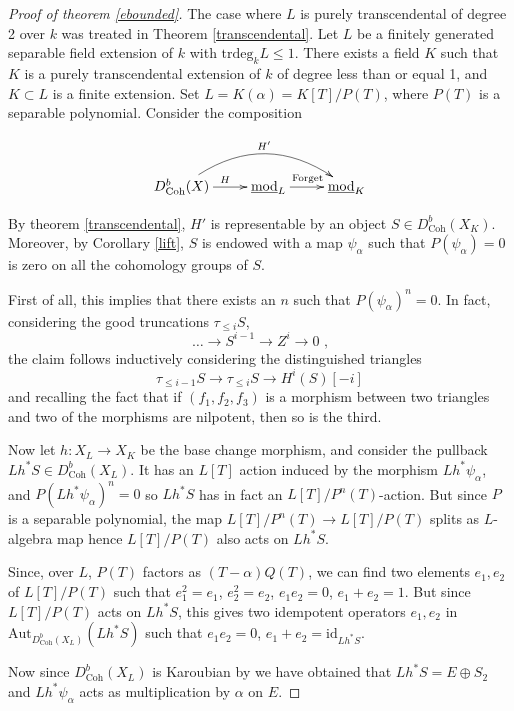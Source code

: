 \documentclass{amsart}
\begin{document}
\begin{proof}[Proof of theorem \ref{ebounded}]
The case where $L$ is purely transcendental of degree 2 over $k$ was treated in Theorem \ref{transcendental}. Let $L$ be a finitely generated separable field extension of $k$ with $\text{trdeg}_{k}L\leq 1$. There exists a field $K$ such that $K$ is a purely transcendental extension of $k$ of degree less than or equal 1, and $K\subset L$ is a finite extension. Set $L=K(\alpha)=K[T]/ P(T)$, where $P(T)$ is a separable polynomial. Consider the composition

$$\xymatrix{
D^{b}_{\mathrm{Coh}}(X) \ar[r]^{H} \ar@/^2pc/ [rr]^{H'} & \underline{\mathrm{mod}}_{L} \ar[r]^{\mathrm{Forget}} &\underline{\mathrm{mod}}_{K}
}$$

By theorem \ref{transcendental}, $H'$ is representable by an object $S\in D^{b}_{\mathrm{Coh}}(X_{K})$. Moreover, by Corollary \ref{lift}, $S$ is endowed with a map $\psi_{\alpha}$ such that $P(\psi_{\alpha})=0$ is zero on all the cohomology groups of $S$. 

First of all, this implies that there exists an $n$ such that $P(\psi_{\alpha})^{n}=0$. In fact, considering the good truncations $\tau_{\leq i}S$,
$$\ldots \to S^{i-1}{\rightarrow} Z^{i}\to 0\text{ ,}$$ 
the claim follows inductively considering the distinguished triangles
$$\tau_{\leq i-1}S \to \tau_{\leq i}S \to H^{i}(S)[-i]$$
and recalling the fact that if $(f_{1},f_{2},f_{3})$ is a morphism between two triangles and two of the morphisms are nilpotent, then so is the third.

Now let $h:X_{L}{\rightarrow} X_{K}$ be the base change morphism, and consider the pullback $Lh^{*}S\in D^{b}_{\mathrm{Coh}}(X_{L})$. It has an $L[T]$ action  induced by the morphism $Lh^{*}\psi_{\alpha}$, and $P(Lh^{*}\psi_{\alpha})^{n}=0$ so $Lh^{*}S$ has in fact an $L[T]/P^{n}(T)$-action. But since $P$ is a separable polynomial, the map $L[T]/P^{n}(T)\to L[T]/P(T)$ splits as $L$-algebra map hence $L[T]/P(T)$ also acts on $Lh^{*}S$.

Since, over $L$, $P(T)$ factors as $(T-\alpha)Q(T)$, we can find two elements $e_{1},e_{2}$ of $L[T]/P(T)$ such that  $e_{1}^{2}=e_{1}$, $e_{2}^{2}=e_{2}$, $e_{1}e_{2}=0$, $e_{1}+e_{2}=1$. But since $L[T]/P(T)$ acts on $Lh^{*}S$, this gives two idempotent operators $e_{1},e_{2}$ in $\text{Aut}_{D^{b}_{\mathrm{Coh}}(X_{L})}(Lh^{*}S)$ such that $e_{1}e_{2}=0$, $e_{1}+e_{2}=\text{id}_{Lh^{*}S}$.

Now since $D^{b}_{\mathrm{Coh}}(X_{L})$ is Karoubian by \cite[Proposition 3.2]{karoubian} we have obtained that $Lh^{*}S=E \oplus S_{2}$ and $Lh^{*}\psi_{\alpha}$ acts as multiplication by $\alpha$ on $E$.


\end{proof}
\end{document}
